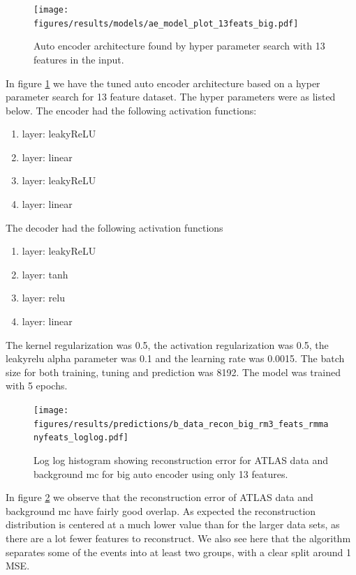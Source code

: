 \documentclass[ reprint, amsmath,amssymb, aps, nofootinbib]{revtex4-2}
\begin{document}
\begin{figure}[H]    
  \centering
         \texttt{[image: figures/results/models/ae\_model\_plot\_13feats\_big.pdf]}
         \caption{Auto encoder architecture found by hyper parameter search with 13 features in the input.}
         \label{fig:ae_13feats_big}  
  
\end{figure}


In figure \ref{fig:ae_13feats_big} we have the tuned auto encoder architecture based on a hyper parameter search for 13 feature dataset. The hyper parameters were as listed below. The encoder had the following activation functions:
\begin{enumerate}
  \item layer: leakyReLU
  \item layer: linear
  \item layer: leakyReLU
  \item layer: linear
\end{enumerate}

The decoder had the following activation functions
\begin{enumerate}
  \item layer: leakyReLU
  \item layer: tanh
  \item layer: relu
  \item layer: linear
\end{enumerate}
The kernel regularization was 0.5, the activation regularization was 0.5, the leakyrelu alpha parameter was 0.1 and the learning rate was 0.0015. The batch size for both training, tuning and prediction was 8192. The model was trained with 5 epochs.

\begin{figure}[H]
     \centering
         \texttt{[image: figures/results/predictions/b\_data\_recon\_big\_rm3\_feats\_rmmanyfeats\_loglog.pdf]}
         \caption{Log log histogram showing reconstruction error for ATLAS data and background mc for big auto encoder using only 13 features.}
     \label{fig:data_b_big_pred_13feats}
\end{figure}

In figure \ref{fig:data_b_big_pred_13feats} we observe that the reconstruction error of ATLAS data and background mc have fairly good overlap. As expected the reconstruction distribution is centered at a much lower value than for the larger data sets, as there are a lot fewer features to reconstruct. We also see here that the algorithm separates some of the events into at least two groups, with a clear split around 1 MSE. 
\end{document}
